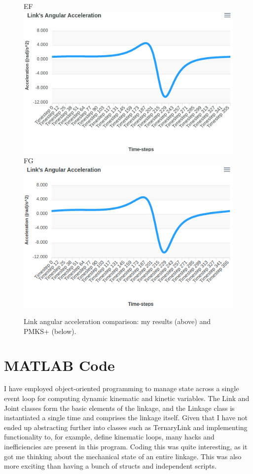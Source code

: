 \documentclass[12pt]{article}
\begin{document}
\begin{figure}[ht]
  EF \includegraphics[scale=0.4]{../pmks-plots/angLinkAcc/angLinkAccEF.png}%
  FG \includegraphics[scale=0.4]{../pmks-plots/angLinkAcc/angLinkAccFG.png}%
  \caption{\label{fig:compare.angLinkAcc}Link angular acceleration comparison: my results (above) and PMKS+ (below).}
\end{figure}


\section{MATLAB Code}%
\label{code}

I have employed object-oriented programming to manage state across a single event loop for computing dynamic kinematic and kinetic variables. The Link and Joint classes form the basic elements of the linkage, and the Linkage class is instantiated a single time and comprises the linkage itself. Given that I have not ended up abstracting further into classes such as TernaryLink and implementing functionality to, for example, define kinematic loops, many hacks and inefficiencies are present in this program. Coding this was quite interesting, as it got me thinking about the mechanical state of an entire linkage. This was also more exciting than having a bunch of structs and independent scripts.
\end{document}
